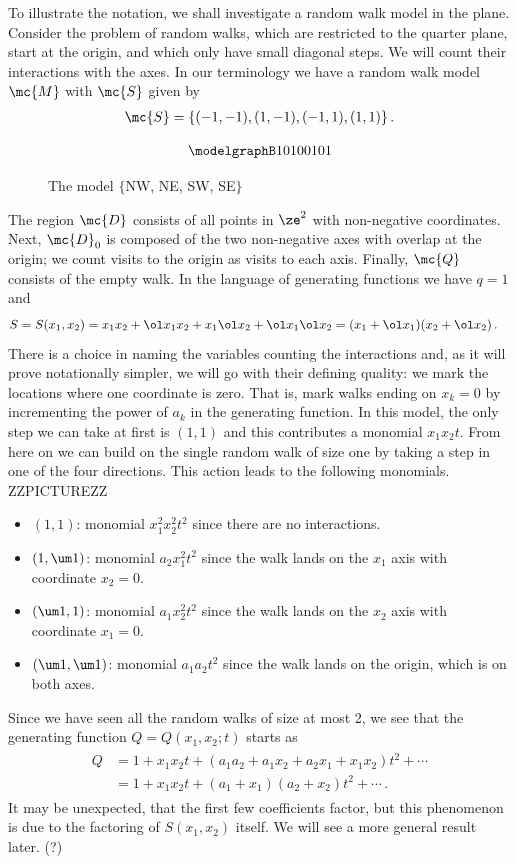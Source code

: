 \begin{example} To illustrate the notation, we shall investigate a random walk model in the plane. Consider the problem of random walks, which are restricted to the quarter plane, start at the origin, and which only have small diagonal steps. We will count their interactions with the axes. In our terminology we have a random walk model $\mc{M}$ with $\mc{S}$ given by
\begin{align}
	\mc{S} = \{(-1,-1),(1,-1),(-1,1),(1,1)\}\,.
\end{align}
\begin{figure}[H]
    \centering
\[
	\modelgraphB 10100101
\]
    \caption{The model $\{$NW, NE, SW, SE$\}$}
\end{figure}
The region $\mc{D}$ consists of all points in $\ze^2$ with non-negative coordinates. Next, $\mc{D}_0$ is composed of the two non-negative axes with overlap at the origin; we count visits to the origin as visits to each axis. Finally, $\mc{Q}$ consists of the empty walk. In the language of generating functions we have $q = 1$ and
\begin{align}
	S &= S(x_1,x_2)  = x_1x_2+\ol x_1x_2+x_1\ol x_2+\ol x_1 \ol x_2 = (x_1+\ol x_1)(x_2 + \ol x_2)\,.
\end{align}
There is a choice in naming the variables counting the interactions and, as it will prove notationally simpler, we will go with their defining quality: we mark the locations where one coordinate is zero. That is, mark walks ending on $x_k = 0$ by incrementing the power of $a_k$ in the generating function. In this model, the only step we can take at first is $(1,1)$ and this contributes a monomial $x_1x_2t$. From here on we can build on the single random walk of size one by taking a step in one of the four directions. This action leads to the following monomials.
ZZPICTUREZZ
\begin{itemize}
	\item $(1,1)$: monomial $x_1^2x_2^2 t^2$ since there are no interactions.
	\item $(1,\um1)$: monomial  $a_2x_1^2t^2$ since the walk lands on the $x_1$ axis with coordinate $x_2 = 0$.
	\item $(\um 1,1)$: monomial  $a_1x_2^2 t^2$ since the walk lands on the $x_2$ axis with coordinate $x_1 = 0$.
	\item $(\um1,\um1)$: monomial  $a_1a_2 t^2$ since the walk lands on the origin, which is on both axes.
\end{itemize}
Since we have seen all the random walks of size at most 2, we see that the generating function $Q = Q(x_1,x_2;t)$ starts as
\begin{align}
\begin{split}
	Q  &=  1 + x_1x_2 t + (a_1a_2 + a_1x_2+a_2x_1 +x_1x_2)t^2 + \cdots\\
	& = 1 + x_1x_2 t+ (a_1+x_1)(a_2+x_2)t^2 + \cdots\,.
\end{split}
\end{align}
It may be unexpected, that the first few coefficients factor, but this phenomenon is due to the factoring of $S(x_1,x_2)$ itself. We will see a more general result later. (?)
\end{example}
